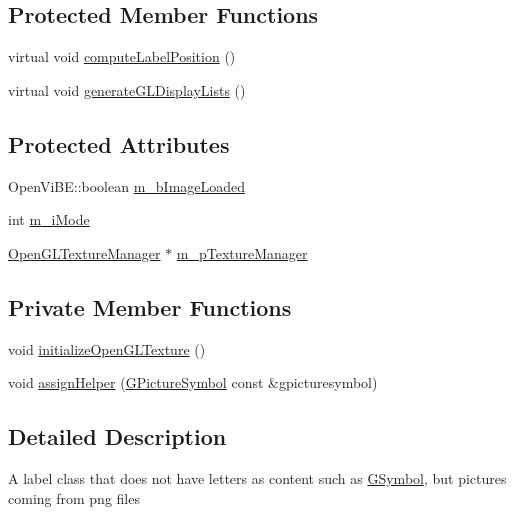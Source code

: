 \subsection*{Protected Member Functions}
\begin{DoxyCompactItemize}
\item 
virtual void \hyperlink{classOpenViBEApplications_1_1GPictureSymbol_afc028614da2a886429a9eb116a79cde5}{computeLabelPosition} ()
\item 
virtual void \hyperlink{classOpenViBEApplications_1_1GPictureSymbol_a6e877a3048dcfa192ba7915188878811}{generateGLDisplayLists} ()
\end{DoxyCompactItemize}
\subsection*{Protected Attributes}
\begin{DoxyCompactItemize}
\item 
OpenViBE::boolean \hyperlink{classOpenViBEApplications_1_1GPictureSymbol_a2d1c4763b217b7b21de1a69ca0a2da35}{m\_\-bImageLoaded}
\item 
int \hyperlink{classOpenViBEApplications_1_1GPictureSymbol_a8a893eb95cd346f30b66bdd7379a80d4}{m\_\-iMode}
\item 
\hyperlink{classOpenViBEApplications_1_1OpenGLTextureManager}{OpenGLTextureManager} $\ast$ \hyperlink{classOpenViBEApplications_1_1GPictureSymbol_a31525f4e7bbde19d7e455944184d12d0}{m\_\-pTextureManager}
\end{DoxyCompactItemize}
\subsection*{Private Member Functions}
\begin{DoxyCompactItemize}
\item 
void \hyperlink{classOpenViBEApplications_1_1GPictureSymbol_aca1fcbd7db1caac6f80c6c20b2269144}{initializeOpenGLTexture} ()
\item 
void \hyperlink{classOpenViBEApplications_1_1GPictureSymbol_a7e0c0d6cf9ca6b22efe29ad886f567cf}{assignHelper} (\hyperlink{classOpenViBEApplications_1_1GPictureSymbol}{GPictureSymbol} const \&gpicturesymbol)
\end{DoxyCompactItemize}


\subsection{Detailed Description}
A label class that does not have letters as content such as \hyperlink{classOpenViBEApplications_1_1GSymbol}{GSymbol}, but pictures coming from png files 

